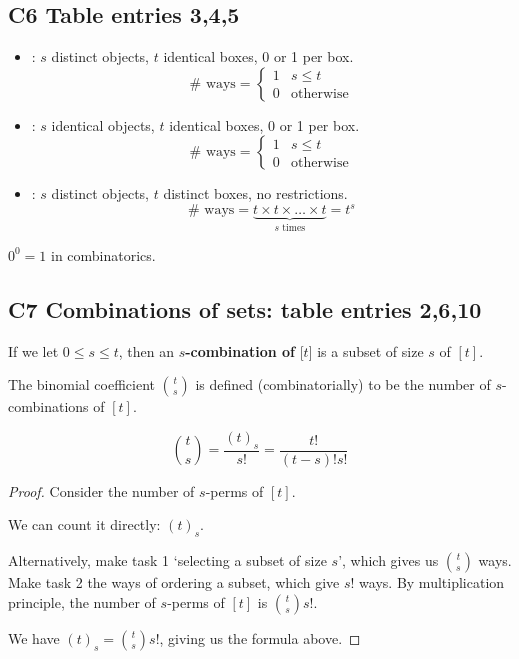 \documentclass[12pt]{article}
\begin{document}
\subsection{C6 Table entries 3,4,5}
\begin{itemize}
    \item {}: $s$ distinct objects, $t$ identical boxes, 0 or 1 per box.
    \[\# \text{ ways} = \begin{cases}
        1 & s\leq t\\
        0 &\text{otherwise}
    \end{cases}\]
    \item {}: $s$ identical objects, $t$ identical boxes, 0 or 1 per box.
    \[\# \text{ ways} = \begin{cases}
        1 & s\leq t\\
        0 &\text{otherwise}
    \end{cases}\]
    \item {}: $s$ distinct objects, $t$ distinct boxes, no restrictions.
    \[\# \text{ ways} = \underset{s \text{ times}}{\underbrace{t\times t\times\dots \times t}}=t^s\]
\end{itemize}

\rmk $0^0=1$ in combinatorics.

\subsection{C7 Combinations of sets: table entries 2,6,10}
If we let $0\leq s\leq t$, then an \textbf{$s$-combination of} [$t$] is a subset of size $s$ of $[t]$.

 The binomial coefficient $t\choose s$ is defined (combinatorially) to be the number of $s$-combinations of $[t]$.

\begin{theorem}
    \[{t\choose s} = \frac{(t)_s}{s!}=\frac{t!}{(t-s)!s!}\]
\end{theorem}
\begin{proof}
    Consider the number of $s$-perms of $[t]$. 
    
    We can count it directly: $(t)_s$.

    Alternatively, make task 1 `selecting a subset of size $s$', which gives us $t\choose s$ ways. Make task 2 the ways of ordering a subset, which give $s!$ ways. By multiplication principle, the number of $s$-perms of $[t]$ is ${t\choose s}s!$.

    We have $(t)_s={t\choose s}s!$, giving us the formula above.
\end{proof}
\end{document}
